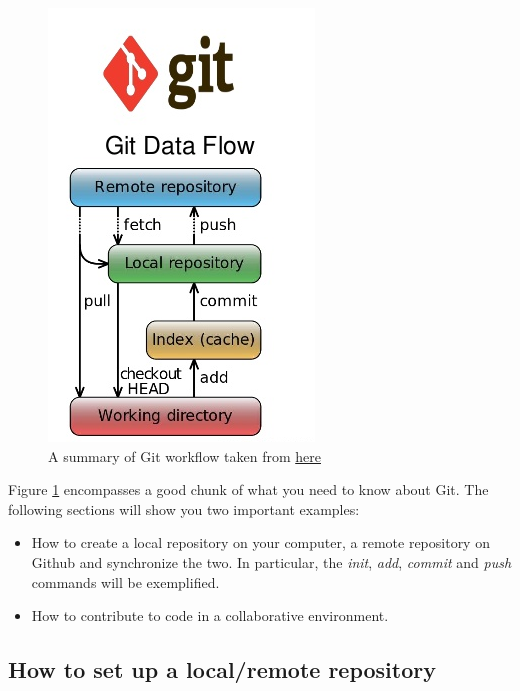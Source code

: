 \begin{figure}[H]
\centering
\includegraphics[scale=0.6]{git_workflow}
\caption{A summary of Git workflow taken from \href{http://www.slideshare.net/VinothKumarKannan/svn-vs-mercurial-vs-github}{here} }
\label{fig:git_workflow}
\end{figure}
Figure \ref{fig:git_workflow} encompasses a good chunk of what you need to know about Git. The following sections will show you two important examples:
\begin{itemize}
\item [1.] How to create a local repository on your computer, a remote repository on Github and synchronize the two. In particular, the \textit{init}, \textit{add}, \textit{commit} and \textit{push} commands will be exemplified. 
\item [2.] How to contribute to code in a collaborative environment.
\end{itemize}
\subsection{How to set up a local/remote repository}

